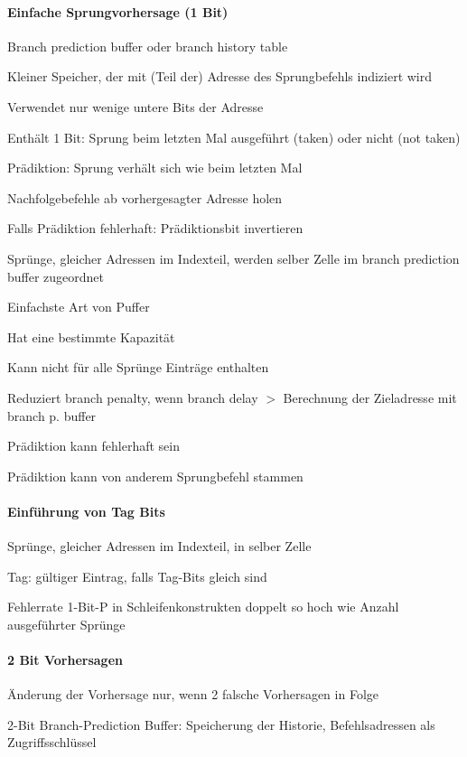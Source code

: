 \documentclass[10pt,landscape]{article}
\begin{document}
\begin{multicols}{3}
  \paragraph{Einfache Sprungvorhersage (1 Bit)}
  \begin{itemize*}
    \item Branch prediction buffer oder branch history table
    \item Kleiner Speicher, der mit (Teil der) Adresse des Sprungbefehls indiziert wird
    \item Verwendet nur wenige untere Bits der Adresse
    \item Enthält 1 Bit: Sprung beim letzten Mal ausgeführt (taken) oder nicht (not taken)
    \item Prädiktion: Sprung verhält sich wie beim letzten Mal
    \item Nachfolgebefehle ab vorhergesagter Adresse holen
    \item Falls Prädiktion fehlerhaft: Prädiktionsbit invertieren
    \item Sprünge, gleicher Adressen im Indexteil, werden selber Zelle im branch prediction buffer zugeordnet
    \item Einfachste Art von Puffer
    \item Hat eine bestimmte Kapazität
    \item Kann nicht für alle Sprünge Einträge enthalten
    \item Reduziert branch penalty, wenn branch delay $>$ Berechnung der Zieladresse mit branch p. buffer
    \item Prädiktion kann fehlerhaft sein
    \item Prädiktion kann von anderem Sprungbefehl stammen
  \end{itemize*}
  
  \paragraph{Einführung von Tag Bits}
  \begin{itemize*}
    \item Sprünge, gleicher Adressen im Indexteil, in selber Zelle
    \item Tag: gültiger Eintrag, falls Tag-Bits gleich sind
    \item Fehlerrate 1-Bit-P in Schleifenkonstrukten doppelt so hoch wie Anzahl ausgeführter Sprünge
  \end{itemize*}
  
  \paragraph{2 Bit Vorhersagen}
  \begin{itemize*}
    \item Änderung der Vorhersage nur, wenn 2 falsche Vorhersagen in Folge
    \item 2-Bit Branch-Prediction Buffer: Speicherung der Historie, Befehlsadressen als Zugriffsschlüssel
  \end{itemize*}
  

\end{multicols}
\end{document}
